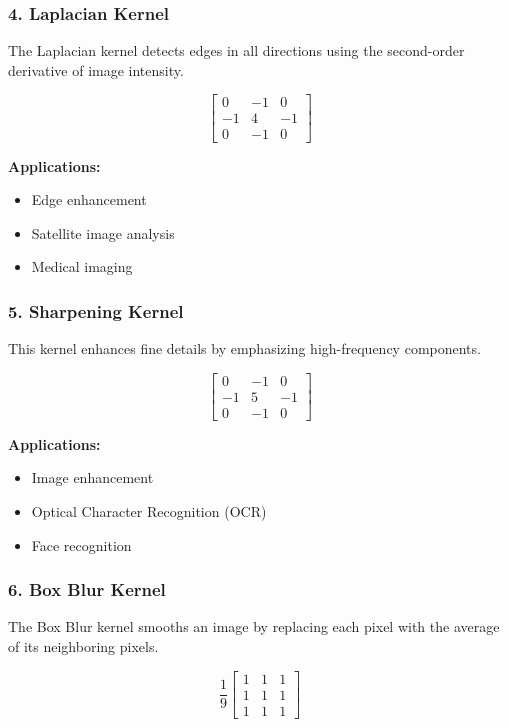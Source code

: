 \documentclass[11pt]{article}
\begin{document}
\subsubsection*{4. Laplacian Kernel}

The Laplacian kernel detects edges in all directions using the second-order derivative of image intensity.

\[
\begin{bmatrix}
0 & -1 & 0\\
-1 & 4 & -1\\
0 & -1 & 0
\end{bmatrix}
\]

\textbf{Applications:}
\begin{itemize}
\item Edge enhancement
\item Satellite image analysis
\item Medical imaging
\end{itemize}

\subsubsection*{5. Sharpening Kernel}

This kernel enhances fine details by emphasizing high-frequency components.

\[
\begin{bmatrix}
0 & -1 & 0\\
-1 & 5 & -1\\
0 & -1 & 0
\end{bmatrix}
\]

\textbf{Applications:}
\begin{itemize}
\item Image enhancement
\item Optical Character Recognition (OCR)
\item Face recognition
\end{itemize}

\subsubsection*{6. Box Blur Kernel}

The Box Blur kernel smooths an image by replacing each pixel with the average of its neighboring pixels.

\[
\frac{1}{9}
\begin{bmatrix}
1 & 1 & 1\\
1 & 1 & 1\\
1 & 1 & 1
\end{bmatrix}
\]
\end{document}
